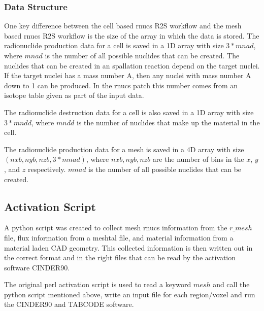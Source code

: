 \subsubsection{Data Structure}
One key difference between the cell based rnucs R2S workflow and the mesh based
rnucs R2S workflow is the size of the array in which the data is stored.
The radionuclide production data for a cell is saved in a 1D array with
size $3*mnad$, where $mnad$ is the number of all possible nuclides
that can be created.
The nuclides that can be created in an spallation reaction
depend on the target nuclei. If the target nuclei has a mass
number A, then any nuclei with mass number A down to 1 can be
produced. In the rnucs patch this number comes from an isotope table
given as part of the input data. 

The radionuclide destruction data for a cell is also saved in a 1D array
with size $3*mndd$, where $mndd$ is the number of nuclides that make up
the material in the cell. 

The radionuclide production data for a mesh is saved in a 4D array
with size $(nxb, nyb,nzb, 3*mnad)$, where $nxb, nyb, nzb$ are the
number of bins in the $x$, $y$, and $z$ respectively. $mnad$ is the
number of all possible nuclides that can be created. 

\subsection{Activation Script}
A python script was created to collect mesh rnucs information from the $r\_mesh$
file, flux information from a meshtal file, and material information from a 
material laden CAD geometry. This collected information is then written out 
in the correct format and in the right files that can be read by the activation 
software CINDER90. 

The original perl activation script is used to read a keyword $mesh$ and call the 
python script mentioned above, write an input file for each region/voxel and run 
the CINDER90 and TABCODE software. 

\newpage

